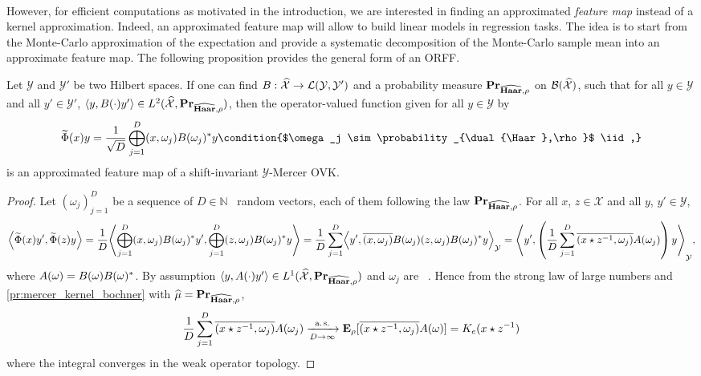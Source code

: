 \paragraph{}
However, for efficient computations as motivated in the introduction, we are interested in finding an approximated \emph{feature map} instead of a kernel approximation. Indeed, an approximated feature map will allow to build linear models in regression tasks. The idea is to start from the Monte-Carlo approximation of the expectation and provide a systematic decomposition of the Monte-Carlo sample mean into an approximate feature map. The following proposition provides the general form of an \acl{ORFF}.
\begin{proposition}[ORFF]
\label{pr:ORFF-map}
Let $\mathcal{Y}$ and $\mathcal{Y}'$ be two Hilbert spaces. If one can find $B: \widehat{\mathcal{X}} \to \mathcal{L}(\mathcal{Y},\mathcal{Y}')$ and a probability measure ${\mathbf{{Pr}}}_{\widehat{\mathbf{Haar}},\rho}$ on $\mathcal{B}(\widehat{\mathcal{X}})$, such that for all $y\in\mathcal{Y}$ and all $y'\in\mathcal{Y}'$, $\langle y, B(\cdot)y'\rangle \in L^2(\widehat{\mathcal{X}}, {\mathbf{{Pr}}}_{\widehat{\mathbf{Haar}},\rho})$, then the operator-valued function given for all $y\in\mathcal{Y}$ by
\begin{equation}
\label{eq:phitilde}
\tildePhi{\omega}(x)y= \frac{1}{\sqrt{D}}\Vect_{j=1}^D\pairing{x, \omega_j}B(\omega_j)^\adjoint y \condition{$\omega_j \sim \probability_{\dual{\Haar},\rho}$ \iid,}
\end{equation}
is an approximated feature map of a shift-invariant $\mathcal{Y}$-Mercer \acl{OVK}.
\end{proposition}
\begin{proof}
Let $(\omega_j)_{j=1}^D$ be a sequence of $D\in\mathbb{N}$ \iid~random vectors, each of them following the law ${\mathbf{{Pr}}}_{\widehat{\mathbf{Haar}},\rho}$. For all $x$, $z \in \mathcal{X}$ and all $y$, $y' \in \mathcal{Y}$,
\begin{dmath*}
\inner*{\tildePhi{\omega}(x)y',\tildePhi{\omega}(z)y}=\frac{1}{D}\inner*{\Vect_{j=1}^D\pairing{x, \omega_j}B(\omega_j)^\adjoint y',  \Vect_{j=1}^D\pairing{z, \omega_j}B(\omega_j)^\adjoint y}
= \frac{1}{D} \sum_{j=1}^D \inner*{y', \conj{\pairing{x, \omega_j}}B(\omega_j)\pairing{z, \omega_j}B(\omega_j)^\adjoint y}_{\mathcal{Y}}
= \inner*{y', \left(\frac{1}{D} \sum_{j=1}^D \conj{\pairing{x\groupop \inv{z}, \omega_j}}A(\omega_j)\right)y}_{\mathcal{Y}},
\end{dmath*}
where $A(\omega)=B(\omega)B(\omega)^* $. By assumption $\langle y, A(\cdot)y'\rangle\in L^1(\widehat{\mathcal{X}},{\mathbf{{Pr}}}_{\widehat{\mathbf{Haar}},\rho})$ and $\omega_j$ are \iid~. Hence from the strong law of large numbers and \cref{pr:mercer_kernel_bochner} with $\widehat{\mu}={\mathbf{{Pr}}}_{\widehat{\mathbf{Haar}},\rho}$,
\begin{dmath*}
\frac{1}{D} \sum_{j=1}^D \conj{\pairing{x\groupop\inv{z},\omega_j}}A(\omega_j)\converges{\asurely}{D\to\infty}\expectation_{\rho}[\conj{\pairing{x\groupop z^{-1},\omega_j}}A(\omega)]=K_e(x\groupop\inv{z})
\end{dmath*}
where the integral converges in the weak operator topology.
\end{proof}
